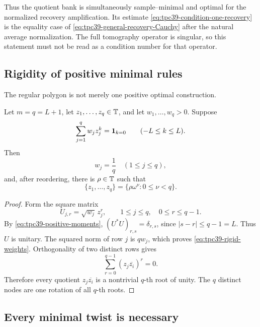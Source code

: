 Thus the quotient bank is simultaneously sample--minimal and optimal for
the normalized recovery amplification.  Its estimate
\eqref{eq:tpc39-condition-one-recovery} is the equality case of
\eqref{eq:tpc39-general-recovery-Cauchy} after the natural average
normalization.  The full tomography operator is singular, so this statement
must not be read as a condition number for that operator.

\subsection{Rigidity of positive minimal rules}

The regular polygon is not merely one positive optimal construction.

\begin{theorem}
\label{thm:tpc39-positive-rule-rigidity}
Let \(m=q=L+1\), let \(z_1,\ldots,z_q\in\mathbb T\), and let
\(w_1,\ldots,w_q>0\).  Suppose
\begin{equation}
 \sum_{j=1}^{q}w_jz_j^k=\mathbf 1_{k=0}
 \qquad(-L\le k\le L).
 \label{eq:tpc39-positive-moments}
\end{equation}
Then
\begin{equation}
 w_j=\frac1q\quad(1\le j\le q),
 \label{eq:tpc39-rigid-weights}
\end{equation}
and, after reordering, there is \(\rho\in\mathbb T\) such that
\begin{equation}
 \{z_1,\ldots,z_q\}
 =\{\rho\omega^\nu:0\le\nu<q\}.
 \label{eq:tpc39-rigid-nodes}
\end{equation}
\end{theorem}

\begin{proof}
Form the square matrix
\begin{equation}
 U_{j,r}=\sqrt{w_j}\,z_j^r,
 \qquad1\le j\le q,
 \quad0\le r\le q-1.
 \label{eq:tpc39-positive-rule-matrix}
\end{equation}
By \eqref{eq:tpc39-positive-moments},
\((U^*U)_{r,s}=\delta_{r,s}\), since \(|s-r|\le q-1=L\).
Thus \(U\) is unitary.  The squared norm of row \(j\) is \(qw_j\),
which proves \eqref{eq:tpc39-rigid-weights}.  Orthogonality of two
distinct rows gives
\[
 \sum_{r=0}^{q-1}(z_j\overline{z_i})^r=0.
\]
Therefore every quotient \(z_j\overline{z_i}\) is a nontrivial
\(q\)-th root of unity.  The \(q\) distinct nodes are one rotation of all
\(q\)-th roots.
\end{proof}

\subsection{Every minimal twist is necessary}

